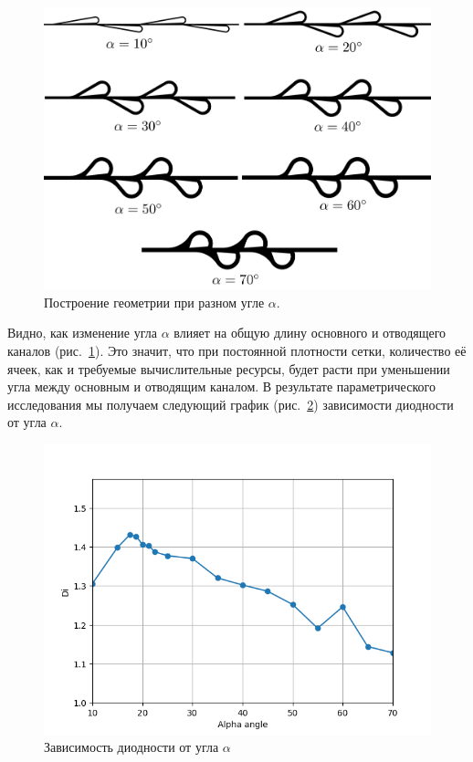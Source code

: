 \documentclass[14pt,a4paper]{article}
\begin{document}
         \begin{figure}[H]
             \centering
             \includegraphics[width = 0.7\linewidth]{allAngle1}
             \caption{Построение геометрии при разном угле $\alpha$.}
             \label{fig:allAngle}
         \end{figure}
         
         
         Видно, как изменение угла $\alpha$ влияет на общую длину основного и отводящего каналов (рис.~\ref{fig:allAngle}). Это значит, что при постоянной плотности сетки, количество её ячеек, как и требуемые вычислительные ресурсы, будет расти при уменьшении угла между основным и отводящим каналом. В результате параметрического исследования мы получаем следующий график (рис.~\ref{fig:alphaAngle}) зависимости диодности от угла $ \alpha $.
         
         
         
         
         \begin{figure}[H]
             \centering
             \includegraphics[width = 1\linewidth]{alphaAngle}
             \caption{Зависимость диодности от угла $\alpha$}
             \label{fig:alphaAngle}
         \end{figure}
         
\end{document}

